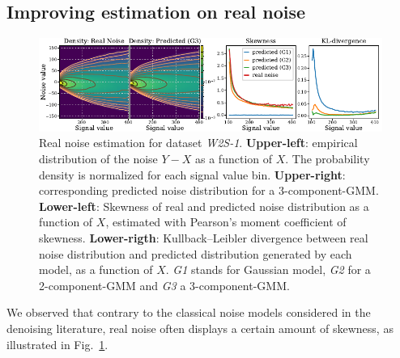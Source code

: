 \documentclass{article}
\begin{document}
\subsection{Improving estimation on real noise}
\label{sec:exp:real:noise}
\begin{figure}
\begin{center}
\centerline{\includegraphics[width=\textwidth]{fig_skewness_1col_w2s-1.pdf}}
\caption{Real noise estimation for dataset \textit{W2S-1}. \textbf{Upper-left}: empirical distribution of the noise $Y - X$ as a function of $X$.
The probability density is normalized for each signal value bin.
\textbf{Upper-right}: corresponding predicted noise distribution for a 3-component-GMM.
\textbf{Lower-left}: Skewness of real and predicted noise distribution as a function of $X$, estimated with Pearson's moment coefficient of skewness\protect\footnotemark.
\textbf{Lower-rigth}:  Kullback–Leibler divergence between real noise distribution and predicted distribution generated by each model, as a function of $X$.
\textit{G1} stands for Gaussian model, \textit{G2} for a 2-component-GMM and \textit{G3} a 3-component-GMM.
}
\label{fig:skewness}
\end{center}
\vskip -0.2in
\end{figure}
We observed that contrary to the classical noise models considered in the denoising literature, real noise often displays a certain amount of skewness, as illustrated in Fig.~\ref{fig:skewness}.
\end{document}
